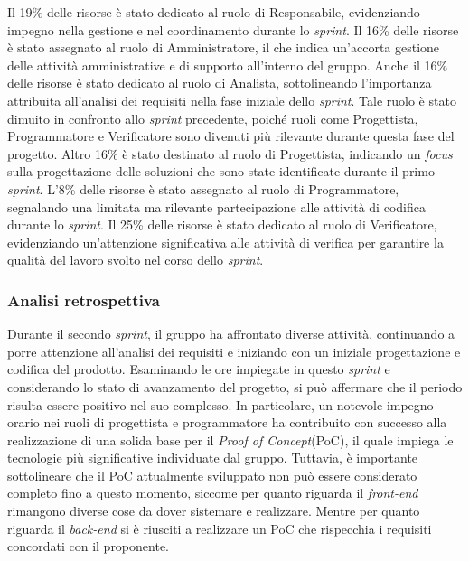 Il 19\% delle risorse è stato dedicato al ruolo di Responsabile, evidenziando impegno nella gestione e nel coordinamento durante lo \textit{sprint}.
Il 16\% delle risorse è stato assegnato al ruolo di Amministratore, il che indica un'accorta gestione delle attività amministrative 
e di supporto all'interno del gruppo.
Anche il 16\% delle risorse è stato dedicato al ruolo di Analista, sottolineando l'importanza attribuita all'analisi 
dei requisiti nella fase iniziale dello \textit{sprint}. Tale ruolo è stato dimuito in confronto allo \textit{sprint} precedente, poiché ruoli come Progettista, 
Programmatore e Verificatore sono divenuti più rilevante durante questa fase del progetto.
Altro 16\% è stato destinato al ruolo di Progettista, indicando un \textit{focus} sulla progettazione delle soluzioni che sono state identificate durante il primo \textit{sprint}.
L'8\% delle risorse è stato assegnato al ruolo di Programmatore, segnalando una limitata ma rilevante partecipazione alle 
attività di codifica durante lo \textit{sprint}.
Il 25\% delle risorse è stato dedicato al ruolo di Verificatore, evidenziando un'attenzione significativa alle attività di 
verifica per garantire la qualità del lavoro svolto nel corso dello \textit{sprint}.

\subsubsection{Analisi retrospettiva}

Durante il secondo \textit{sprint}, il gruppo ha affrontato diverse attività, continuando a porre attenzione all'analisi dei requisiti e iniziando con un iniziale progettazione e codifica del prodotto. 
Esaminando le ore impiegate in questo \textit{sprint} e considerando lo stato di avanzamento del progetto, si può affermare che il periodo risulta essere positivo nel suo complesso. 
In particolare, un notevole impegno orario nei ruoli di progettista e programmatore ha contribuito con successo alla realizzazione di una solida base per il \textit{Proof of Concept}\g (PoC),
il quale impiega le tecnologie più significative individuate dal gruppo. Tuttavia, è importante sottolineare che il PoC attualmente sviluppato non può 
essere considerato completo fino a questo momento, siccome per quanto riguarda il \textit{front-end} rimangono diverse cose da dover sistemare e realizzare.
Mentre per quanto riguarda il \textit{back-end} si è riusciti a realizzare un PoC che rispecchia i requisiti concordati con il proponente.

